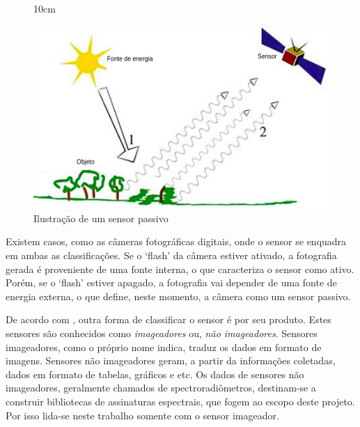 \begin{figure}[!ht]{10cm}
  \caption{Ilustração de um sensor passivo} \label{sr_passivo}
  \includegraphics[width=1\hsize]{figuras/sensor_passivo.png}
\end{figure}

Existem casos, como as câmeras fotográficas digitais, onde o sensor se enquadra em ambas as classificações. Se o `flash' da câmera estiver ativado, a fotografia gerada é proveniente de uma fonte interna, o que caracteriza o sensor como ativo. Porém, se o `flash' estiver apagado, a fotografia vai depender de uma fonte de energia externa, o que define, neste momento, a câmera como um sensor passivo.

De acordo com , outra forma de classificar o sensor é por seu produto. Estes sensores são conhecidos como \textit{imageadores} ou, \textit{não imageadores}. Sensores imageadores, como o próprio nome indica, traduz os dados em formato de imagens. Sensores não imageadores geram, a partir da informações coletadas, dados em formato de tabelas, gráficos e etc. Os dados de sensores não imageadores, geralmente chamados de spectroradiômetros, destinam-se a construir bibliotecas de assinaturas espectrais, que fogem ao escopo deste projeto. Por isso lida-se neste trabalho somente com o sensor imageador.

